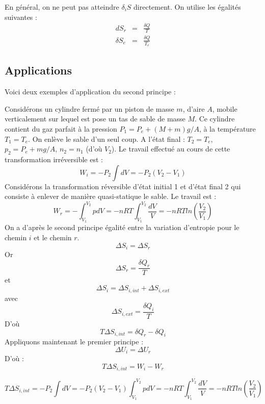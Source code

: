 \documentclass[12pt]{book}
\begin{document}
\begin{rem}
En g\'en\'eral, on ne peut pas atteindre $ \delta_iS $ directement. On
utilise les \'egalit\'es suivantes :
\begin{eqnarray}
dS_r&=&\frac{\delta Q}{T}\\
\delta S_e&=&\frac{\delta Q}{T_e}
\end{eqnarray}
\end{rem}

\subsection{Applications}
Voici deux exemples d'application du second principe :
\begin{exmp}
Consid\'erons un cylindre ferm\'e par un piston de masse $m$, d'aire $A$,
mobile verticalement sur lequel est pose un tas de sable de masse $M$.
Ce cylindre contient du gaz parfait \`a la pression $P_1=P_e+(M+m)g/A$,
\`a la temp\'erature $T_1=T_e$. On enl\`eve le sable d'un seul coup. A
l'\'etat final : $T_2=T_e$, $p_2=P_e+mg/A$, $n_2=n_1$  (d'o\`u $V_2$). Le
travail effectu\'e au cours de cette transformation irr\'eversible est :
\begin{equation}
W_i=-P_2\int dV=-P_2(V_2-V_1)
\end{equation}
Consid\'erons la transformation r\'eversible d'\'etat initial 1 et
d'\'etat 
final 2 qui consiste \`a enlever de mani\`ere quasi-statique le sable. Le
travail est :
\begin{equation}
W_r=-\int_{V_1}^{V_2}pdV =-nRT\int_{V_1}^{V_2}\frac{dV}{V}=
-nRTln(\frac{V_2}{V_1}) 
\end{equation}
On a d'apr\`es le second principe \'egalit\'e entre la variation
d'entropie 
pour le chemin $i$ et le chemin $r$.
\begin{equation}
\Delta S_i=\Delta S_r
\end{equation}
Or 
\begin{equation}
\Delta S_r=\frac{\delta Q_r}{T}
\end{equation}
et 
\begin{equation}
\Delta S_i=\Delta S_{i,int}+\Delta S_{i,ext}
\end{equation}
avec
\begin{equation}
\Delta S_{i,ext}=\frac{\delta Q_i}{T}
\end{equation}
D'o\`u
\begin{equation}
T\Delta S_{i,int}=\delta Q_r-\delta Q_i
\end{equation}    
Appliquons maintenant le premier principe :
\begin{equation}
\Delta U_i=\Delta U_r
\end{equation}
D'o\`u :
\begin{equation}
T\Delta S_{i,int}=W_i-W_r
\end{equation}

$$
T\Delta S_{i,int}=-P_2\int
dV=-P_2(V_2-V_1)\int_{V_1}^{V_2}pdV =
-nRT\int_{V_1}^{V_2}\frac{dV}{V}=-nRTln(\frac{V_2}{V_1}) 
$$
\end{exmp}
\end{document}
